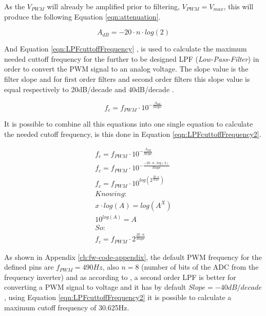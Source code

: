 		As the $V_{PWM}$ will already be amplified prior to filtering, $V_{PWM}=V_{max}$, this will produce the following Equation \ref{eqn:attenuation}.
		
			\begin{equation}\label{eqn:attenuation}
				A_{dB}=-20 \cdot n \cdot log \left( 2 \right) 
			\end{equation}
	
		And Equation \ref{eqn:LPFcuttoffFrequency} \cite{metivier2013pwm}, is used to calculate the maximum needed cuttoff frequency for the further to be designed LPF (\textit{Low-Pass-Filter}) in order to convert the PWM signal to an analog voltage. The slope value is the filter slope and for first order filters and second order filters this slope value is equal respectively to 20dB/decade and 40dB/decade \cite{metivier2013pwm}.
	
			\begin{equation}\label{eqn:LPFcuttoffFrequency}
				f_{c}=f_{PWM} \cdot 10^{-\frac{A_{dB}}{Slope}}
			\end{equation}

		It is possible to combine all this equations into one single equation to calculate the needed cutoff frequency, is this done in Equation \ref{eqn:LPFcuttoffFrequency2}.

			\begin{equation}\label{eqn:LPFcuttoffFrequency2}
				\begin{split}
					f_{c}=f_{PWM} \cdot 10^{-\frac{A_{dB}}{Slope}}	\\
					f_{c}=f_{PWM} \cdot 10^{-\frac{-20 \cdot n \cdot log \left( 2 \right)}{Slope}}	\\
					f_{c}=f_{PWM} \cdot 10^{log \left( 2^{\frac{20 \cdot n }{Slope}} \right)}	\\
					Knowing:	\\
					x \cdot log \left( A \right) =  log \left( A^{X} \right) \\
					10^{log \left( A \right) } = A	\\
					So:	\\
					f_{c}=f_{PWM} \cdot  2^{\frac{20 \cdot n}{Slope}}
				\end{split}
			\end{equation}

	
		As shown in Appendix \ref{ch:fw-code-appendix}, the default PWM frequency for the defined pins are $f_{PWM}=490Hz$, also $n=8$ (number of bits of the ADC from the frequency inverter) and as according to \cite{metivier2013pwm}, a second order LPF is better for converting a PWM signal to voltage and it has by default $Slope=-40dB/decade$, using Equation \ref{eqn:LPFcuttoffFrequency2} it is possible to calculate a maximum cutoff frequency of 30.625Hz. 

